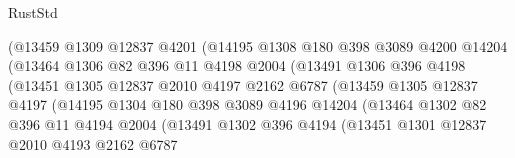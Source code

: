 \begin{lexlean}{RustStd}
\begin{coremodule}
                            (@13459
                              @1309
                              @12837
                              @4201
                              (@14195
                                @1308
                                @180
                                @398
                                @3089
                                @4200
                                @14204
                                (@13464
                                  @1306
                                  @82
                                  @396
                                  @11
                                  @4198
                                  @2004
                                  (@13491
                                    @1306
                                    @396
                                    @4198
                                    (@13451
                                      @1305
                                      @12837
                                      @2010
                                      @4197
                                      @2162
                                      @6787
                                      (@13459
                                        @1305
                                        @12837
                                        @4197
                                        (@14195
                                          @1304
                                          @180
                                          @398
                                          @3089
                                          @4196
                                          @14204
                                          (@13464
                                            @1302
                                            @82
                                            @396
                                            @11
                                            @4194
                                            @2004
                                            (@13491
                                              @1302
                                              @396
                                              @4194
                                              (@13451
                                                @1301
                                                @12837
                                                @2010
                                                @4193
                                                @2162
                                                @6787

\end{coremodule}
\end{lexlean}
